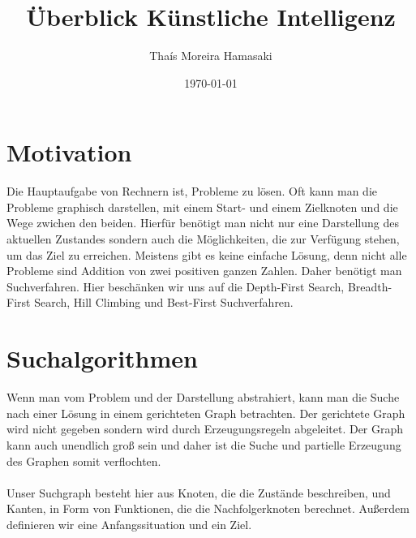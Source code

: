 \documentclass[fleqn]{article}
\title{Überblick Künstliche Intelligenz}
\author{Thaís Moreira Hamasaki}
\date{\today}
\numberwithin{equation}{section}
\numberwithin{figure}{section}
\numberwithin{table}{section}
\begin{document}
  \lstset{language=Haskell,frame=single,basicstyle=\small\ttfamily,numbers=left,firstnumber=1}
  \lstset{language=Prolog,frame=single,basicstyle=\small\ttfamily,numbers=left,firstnumber=1}

\maketitle
\newpage

\tableofcontents
\newpage

\section{Motivation}

Die Hauptaufgabe von Rechnern ist, Probleme zu lösen. Oft kann man die Probleme graphisch darstellen, mit einem Start- und einem Zielknoten und die Wege zwichen den beiden. Hierfür benötigt man nicht nur eine Darstellung des aktuellen Zustandes sondern auch die Möglichkeiten, die zur Verfügung stehen, um das Ziel zu erreichen. Meistens gibt es keine einfache Lösung, denn nicht alle Probleme sind Addition von zwei positiven ganzen Zahlen. Daher benötigt man Suchverfahren. Hier beschänken wir uns auf die Depth-First Search, Breadth-First Search, Hill Climbing und Best-First Suchverfahren.

\section{Suchalgorithmen}

Wenn man vom Problem und der Darstellung abstrahiert, kann man die Suche nach einer Lösung in einem gerichteten Graph betrachten. Der gerichtete Graph wird nicht gegeben  sondern wird durch Erzeugungsregeln abgeleitet. Der Graph kann auch unendlich groß sein und daher ist die Suche und partielle Erzeugung des Graphen somit verflochten. \\
\\
Unser Suchgraph besteht hier aus Knoten, die die Zustände beschreiben, und Kanten, in Form von Funktionen, die die Nachfolgerknoten berechnet. Außerdem definieren wir eine Anfangssituation und ein Ziel.\\

\bigskip
{}
\end{document}
